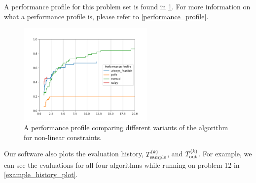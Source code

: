 A performance profile for this problem set is found in \cref{nonlinear_performance_profile_image}.
For more information on what a performance profile is, please refer to \cref{performance_profile}.

\begin{figure}[ht]
    \centering
    \includegraphics[width=250px]{images/nonlinear_performance_profile.png}
    \caption[A performance profile comparing different variants of the algorithm for non-linear constraints.]{
    	A performance profile comparing different variants of the algorithm for non-linear constraints.
    }
    \label{nonlinear_performance_profile_image}
\end{figure}


Our software also plots the evaluation history, ${T_{\text{sample}}^{(k)}}$, and ${T_{\text{out}}^{(k)}}$.
For example, we can see the evaluations for all four algorithms while running on problem 12 in \cref{example_history_plot}.



